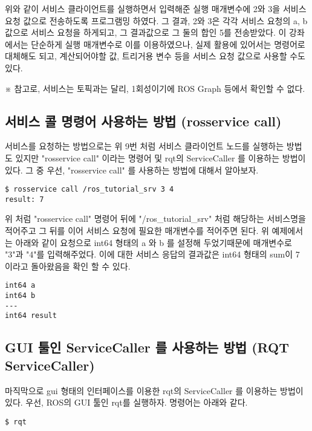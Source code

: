 위와 같이 서비스 클라이언트를 실행하면서 입력해준 실행 매개변수에 2와 3을 서비스 요청 값으로 전송하도록 프로그램밍 하였다. 그 결과, 2와 3은 각각 서비스 요청의 a, b 값으로 서비스 요청을 하게되고, 그 결과값으로 그 둘의 합인 5를 전송받았다. 이 강좌에서는 단순하게 실행 매개변수로 이를 이용하였으나, 실제 활용에 있어서는 명령어로 대체해도 되고, 계산되어야할 값, 트리거용 변수 등을 서비스 요청 값으로 사용할 수도 있다.

※ 참고로, 서비스는 토픽과는 달리, 1회성이기에 ROS Graph 등에서 확인할 수 없다.

\subsection{서비스 콜 명령어 사용하는 방법 (rosservice call)}

서비스를 요청하는 방법으로는 위 9번 처럼 서비스 클라이언트 노드를 실행하는 방법도 있지만 "rosservice call" 이라는 명령어 및 rqt의 ServiceCaller 를 이용하는 방법이 있다. 그 중 우선, "rosservice call" 를 사용하는 방법에 대해서 알아보자.

\begin{lstlisting}[language=ROS]
$ rosservice call /ros_tutorial_srv 3 4
result: 7
\end{lstlisting}

위 처럼 "rosservice call" 명령어 뒤에 "/ros\_tutorial\_srv" 처럼 해당하는 서비스명을 적어주고 그 뒤를 이어 서비스 요청에 필요한 매개변수를 적어주면 된다. 위 예제에서는 아래와 같이 요청으로 int64 형태의 a 와 b 를 설정해 두었기때문에 매개변수로 "3"과 "4"를 입력해주었다. 이에 대한 서비스 응답의 결과값은 int64 형태의 sum이 7 이라고 돌아왔음을 확인 할 수 있다.  

\begin{lstlisting}[language=ROS]
int64 a
int64 b
---
int64 result
\end{lstlisting}

\subsection{GUI 툴인 ServiceCaller 를 사용하는 방법 (RQT ServiceCaller)}

마직막으로 gui 형태의 인터페이스를 이용한 rqt의 ServiceCaller 를 이용하는 방법이 있다. 우선, ROS의 GUI 툴인 rqt를 실행하자. 명령어는 아래와 같다.

\begin{lstlisting}[language=ROS]
$ rqt
\end{lstlisting}

